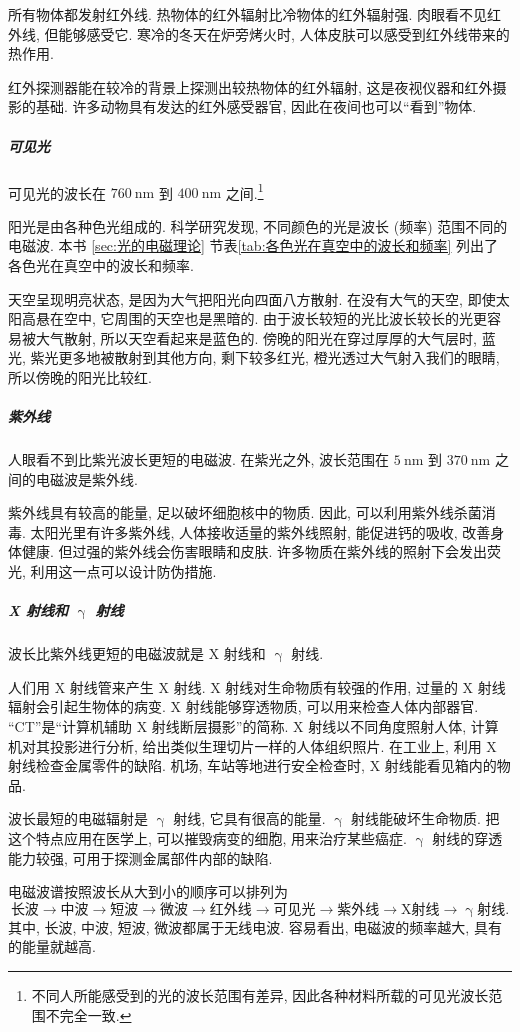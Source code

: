 \documentclass[UTF8,openany,fontset=fandol]{ctexbook}
\theoremstyle{chinesetextbook}
\newcommand{\unit}[1]{\ \mathrm{#1}}
\begin{document}
所有物体都发射红外线. 热物体的红外辐射比冷物体的红外辐射强. 肉眼看不见红外线, 但能够感受它. 寒冷的冬天在炉旁烤火时, 人体皮肤可以感受到红外线带来的热作用.

红外探测器能在较冷的背景上探测出较热物体的红外辐射, 这是夜视仪器和红外摄影的基础. 许多动物具有发达的红外感受器官, 因此在夜间也可以“看到”物体.

\subparagraph{可见光} 可见光的波长在 $760\unit{nm}$ 到 $400\unit{nm}$ 之间.\footnote{不同人所能感受到的光的波长范围有差异, 因此各种材料所载的可见光波长范围不完全一致.}

阳光是由各种色光组成的. 科学研究发现, 不同颜色的光是波长 (频率) 范围不同的电磁波. 本书 \ref{sec:光的电磁理论} 节表\ref{tab:各色光在真空中的波长和频率} 列出了各色光在真空中的波长和频率.

天空呈现明亮状态, 是因为大气把阳光向四面八方散射. 在没有大气的天空, 即使太阳高悬在空中, 它周围的天空也是黑暗的. 由于波长较短的光比波长较长的光更容易被大气散射, 所以天空看起来是蓝色的. 傍晚的阳光在穿过厚厚的大气层时, 蓝光, 紫光更多地被散射到其他方向, 剩下较多红光, 橙光透过大气射入我们的眼睛, 所以傍晚的阳光比较红.

\subparagraph{紫外线}人眼看不到比紫光波长更短的电磁波. 在紫光之外, 波长范围在 $5\unit{nm}$ 到 $370\unit{nm}$ 之间的电磁波是紫外线.

紫外线具有较高的能量, 足以破坏细胞核中的物质. 因此, 可以利用紫外线杀菌消毒. 太阳光里有许多紫外线, 人体接收适量的紫外线照射, 能促进钙的吸收, 改善身体健康. 但过强的紫外线会伤害眼睛和皮肤. 许多物质在紫外线的照射下会发出荧光, 利用这一点可以设计防伪措施.

\subparagraph{X 射线和 $\upgamma$ 射线} 波长比紫外线更短的电磁波就是 X 射线和 $\upgamma$ 射线.

人们用 X 射线管来产生 X 射线. X 射线对生命物质有较强的作用, 过量的 X 射线辐射会引起生物体的病变. X 射线能够穿透物质, 可以用来检查人体内部器官. “CT”是“计算机辅助 X 射线断层摄影”的简称. X 射线以不同角度照射人体, 计算机对其投影进行分析, 给出类似生理切片一样的人体组织照片. 在工业上, 利用 X 射线检查金属零件的缺陷. 机场, 车站等地进行安全检查时, X 射线能看见箱内的物品.

波长最短的电磁辐射是 $\upgamma$ 射线, 它具有很高的能量. $\upgamma$ 射线能破坏生命物质. 把这个特点应用在医学上, 可以摧毁病变的细胞, 用来治疗某些癌症. $\upgamma$ 射线的穿透能力较强, 可用于探测金属部件内部的缺陷.

电磁波谱按照波长从大到小的顺序可以排列为
\[
\text{长波}\rightarrow\text{中波}\rightarrow\text{短波}\rightarrow\text{微波}\rightarrow\text{红外线}\rightarrow\text{可见光}\rightarrow\text{紫外线}\rightarrow\text{X射线}\rightarrow\upgamma \text{射线}.
\]
其中, 长波, 中波, 短波, 微波都属于无线电波. 容易看出, 电磁波的频率越大, 具有的能量就越高.
\end{document}
